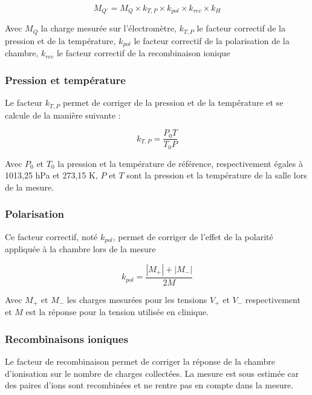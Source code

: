 \documentclass{article}
\begin{document}
\begin{equation}
  M_{Q'} = M_Q \times k_{T,P} \times k_{pol} \times k_{rec} \times k_H
  \label{eq_corr_charge}
\end{equation}

Avec $M_Q$ la charge mesurée sur l'électromètre, $k_{T,P}$ le facteur correctif de la pression et de la température, $k_{pol}$ le facteur correctif de la polarisation de la chambre, $k_{rec}$ le facteur correctif de la recombinaison ionique 

\subsubsection{Pression et température}

Le facteur $k_{T,P}$ permet de corriger de la pression et de la température et se calcule de la manière suivante :

\begin{equation}
  k_{T,P} = \dfrac{P_0T}{T_0P}
  \label{eq_k_TP}
\end{equation}

Avec $P_0$ et $T_0$ la pression et la température de référence, respectivement égales à 1013,25 hPa et 273,15 K, $P$ et $T$ sont la pression et la température de la salle lors de la mesure.

\subsubsection{Polarisation}

Ce facteur correctif, noté $k_{pol}$, permet de corriger de l'effet de la polarité appliquée à la chambre lors de la mesure

\begin{equation}
  k_{pol} = \dfrac{|M_+| + |M_-|}{2M}
  \label{eq_pol}
\end{equation}

Avec $M_+$ et $M_-$ les charges mesurées pour les tensions $V_+$ et $V_-$ respectivement et $M$ est la réponse pour la tension utilisée en clinique.

\subsubsection{Recombinaisons ioniques}

Le facteur de recombinaison permet de corriger la réponse de la chambre d'ionisation sur le nombre de charges collectées. La mesure est sous estimée car des paires d'ions sont recombinées et ne rentre pas en compte dans la mesure.
\end{document}
